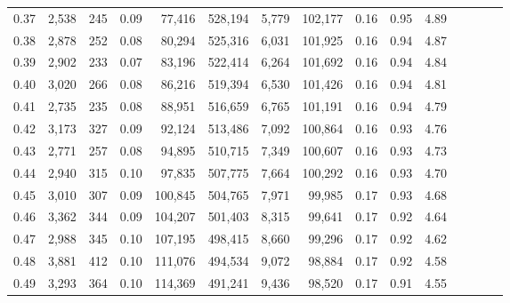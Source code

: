\begin{tabular}{rrrcrrrrrrrrrrr}
0.37 &   2,538 &    245 &                                       0.09 &   77,416 &  528,194 &    5,779 &  102,177 &  0.16 &  0.95 &                         4.89 \\
0.38 &   2,878 &    252 &                                       0.08 &   80,294 &  525,316 &    6,031 &  101,925 &  0.16 &  0.94 &                         4.87 \\
0.39 &   2,902 &    233 &                                       0.07 &   83,196 &  522,414 &    6,264 &  101,692 &  0.16 &  0.94 &                         4.84 \\
0.40 &   3,020 &    266 &                                       0.08 &   86,216 &  519,394 &    6,530 &  101,426 &  0.16 &  0.94 &                         4.81 \\
0.41 &   2,735 &    235 &                                       0.08 &   88,951 &  516,659 &    6,765 &  101,191 &  0.16 &  0.94 &                         4.79 \\
0.42 &   3,173 &    327 &                                       0.09 &   92,124 &  513,486 &    7,092 &  100,864 &  0.16 &  0.93 &                         4.76 \\
0.43 &   2,771 &    257 &                                       0.08 &   94,895 &  510,715 &    7,349 &  100,607 &  0.16 &  0.93 &                         4.73 \\
0.44 &   2,940 &    315 &                                       0.10 &   97,835 &  507,775 &    7,664 &  100,292 &  0.16 &  0.93 &                         4.70 \\
0.45 &   3,010 &    307 &                                       0.09 &  100,845 &  504,765 &    7,971 &   99,985 &  0.17 &  0.93 &                         4.68 \\
0.46 &   3,362 &    344 &                                       0.09 &  104,207 &  501,403 &    8,315 &   99,641 &  0.17 &  0.92 &                         4.64 \\
0.47 &   2,988 &    345 &                                       0.10 &  107,195 &  498,415 &    8,660 &   99,296 &  0.17 &  0.92 &                         4.62 \\
0.48 &   3,881 &    412 &                                       0.10 &  111,076 &  494,534 &    9,072 &   98,884 &  0.17 &  0.92 &                         4.58 \\
0.49 &   3,293 &    364 &                                       0.10 &  114,369 &  491,241 &    9,436 &   98,520 &  0.17 &  0.91 &                         4.55 \\

\end{tabular}
